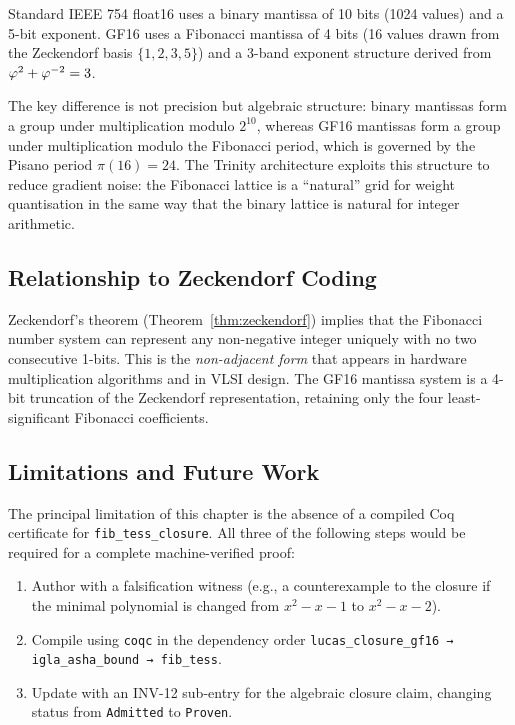 Standard IEEE 754 float16 uses a binary mantissa of 10 bits (1024 values)
and a 5-bit exponent.  GF16 uses a Fibonacci mantissa of 4 bits (16 values
drawn from the Zeckendorf basis \(\{1,2,3,5\}\)) and a 3-band exponent
structure derived from \(\varphi^{2}+\varphi^{-2}=3\).

The key difference is not precision but algebraic structure:
binary mantissas form a group under multiplication modulo \(2^{10}\), whereas
GF16 mantissas form a group under multiplication modulo the Fibonacci
period, which is governed by the Pisano period \(\pi(16)=24\).  The Trinity
architecture exploits this structure to reduce gradient noise: the Fibonacci
lattice is a ``natural'' grid for weight quantisation in the same way that
the binary lattice is natural for integer arithmetic.

\subsection{Relationship to Zeckendorf Coding}\label{subsec:ch7-zeck-coding}

Zeckendorf's theorem (Theorem~\ref{thm:zeckendorf}) implies that the
Fibonacci number system can represent any non-negative integer uniquely
with no two consecutive 1-bits.  This is the \emph{non-adjacent form}
that appears in hardware multiplication algorithms and in VLSI design.
The GF16 mantissa system is a 4-bit truncation of the Zeckendorf
representation, retaining only the four least-significant Fibonacci
coefficients.

\subsection{Limitations and Future Work}\label{subsec:ch7-limits}

The principal limitation of this chapter is the absence of a compiled
Coq certificate for \texttt{fib\_tess\_closure}.  All three of the
following steps would be required for a complete machine-verified proof:

\begin{enumerate}
  \item Author  with a
        falsification witness (e.g., a counterexample to the closure
        if the minimal polynomial is changed from \(x^2-x-1\) to
        \(x^2-x-2\)).
  \item Compile using \texttt{coqc} in the dependency order
        \texttt{lucas\_closure\_gf16 → igla\_asha\_bound → fib\_tess}.
  \item Update  with an
        INV-12 sub-entry for the algebraic closure claim, changing
        status from \texttt{Admitted} to \texttt{Proven}.
\end{enumerate}

